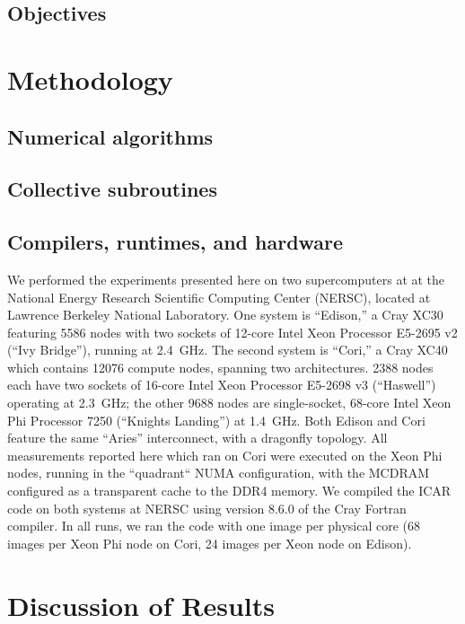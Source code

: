 \subsection{Objectives}

\section{Methodology}
\subsection{Numerical algorithms}
\subsection{Collective subroutines}
\subsection{Compilers, runtimes, and hardware}

We performed the experiments presented here on two supercomputers at at the National Energy Research Scientific Computing Center (NERSC), located at Lawrence Berkeley National Laboratory.
One system is ``Edison,'' a Cray XC30 featuring 5586 nodes with two sockets of 12-core Intel Xeon Processor E5-2695 v2 (``Ivy Bridge''), running at \num{2.4}~\si{\giga\hertz}.
The second system is ``Cori,'' a Cray XC40 which contains \num{12076} compute nodes, spanning two architectures. \num{2388} nodes each have two sockets of 16-core Intel Xeon Processor E5-2698 v3 (``Haswell'') operating at \num{2.3}~\si{\giga\hertz}; the other \num{9688} nodes are single-socket, 68-core Intel Xeon Phi Processor 7250 (``Knights Landing'') at \num{1.4}~\si{\giga\hertz}.
Both Edison and Cori feature the same ``Aries'' interconnect, with a dragonfly topology.
All measurements reported here which ran on Cori were executed on the Xeon Phi nodes, running in the ``quadrant`` NUMA configuration, with the MCDRAM configured as a transparent cache to the DDR4 memory.
We compiled the ICAR code on both systems at NERSC using version 8.6.0 of the Cray Fortran compiler.
In all runs, we ran the code with one image per physical core (68 images per Xeon Phi node on Cori, 24 images per Xeon node on Edison).

\section{Discussion of Results}

